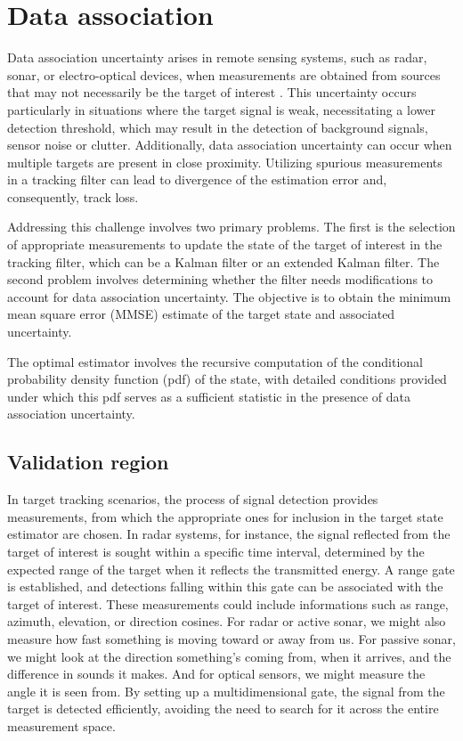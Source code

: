 \section{Data association}
\label{sec:data_association}
Data association uncertainty arises in remote sensing systems, such as radar, sonar, or electro-optical devices, when
measurements are obtained from sources that may not necessarily be the target of interest \cite{BarShalomPDA}. This uncertainty
occurs particularly in situations where the target signal is weak, necessitating a lower detection threshold, which may result in the detection of background signals, sensor noise or clutter. Additionally, data association uncertainty can occur when multiple targets are present in close proximity. Utilizing spurious measurements in a tracking filter can lead to divergence of the estimation error and, consequently, track loss.

Addressing this challenge involves two primary problems. The first is the selection of appropriate measurements to
update the state of the target of interest in the tracking filter, which can be a Kalman filter or an extended Kalman
filter. The second problem involves determining whether the filter needs modifications to account for data
association uncertainty. The objective is to obtain the minimum mean square error (MMSE) estimate of the target state
and associated uncertainty.

The optimal estimator involves the recursive computation of the conditional probability density function (pdf) of the
state, with detailed conditions provided under which this pdf serves as a sufficient statistic in the presence of
data association uncertainty.
  \subsection{Validation region}
    \label{sec:validation_region}
In target tracking scenarios, the process of signal detection provides measurements, from which the appropriate ones
for inclusion in the target state estimator are chosen. In radar systems, for instance, the signal reflected from the
target of interest is sought within a specific time interval, determined by the expected range of the target when it
reflects the transmitted energy. A range gate is established, and detections falling within this gate can be
associated with the target of interest. These measurements could include informations such as range, azimuth, elevation,
or direction cosines. For radar or active sonar, we might also measure how fast something is moving toward or away
from us. For passive sonar, we might look at the direction something's coming from, when it arrives, and the
difference in sounds it makes. And for optical sensors, we might measure the angle it is seen from. By setting up a
multidimensional gate, the signal from the target is detected efficiently, avoiding the need to search for it across the entire measurement space.


